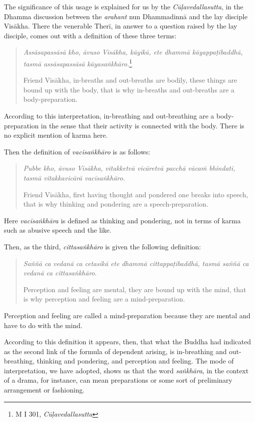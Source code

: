 The significance of this usage is explained for us by the \emph{Cūḷavedallasutta}, in the Dhamma discussion between the \emph{arahant} nun Dhammadinnā and the lay disciple Visākha. There the venerable Therī, in answer to a question raised by the lay disciple, comes out with a definition of these three terms:

\begin{quote}
\emph{Assāsapassāsā kho, āvuso Visākha, kāyikā, ete dhammā kāyappaṭibaddhā, tasmā assāsapassāsā kāyasaṅkhāro.}\footnote{M I 301, \emph{Cūḷavedallasutta}}

Friend Visākha, in-breaths and out-breaths are bodily, these things are bound up with the body, that is why in-breaths and out-breaths are a body-preparation.
\end{quote}

According to this interpretation, in-breathing and out-breathing are a body-preparation in the sense that their activity is connected with the body. There is no explicit mention of karma here.

Then the definition of \emph{vacīsaṅkhāro} is as follows:

\begin{quote}
\emph{Pubbe kho, āvuso Visākha, vitakketvā vicāretvā pacchā vācaṁ bhindati, tasmā vitakkavicārā vacīsaṅkhāro.}

Friend Visākha, first having thought and pondered one breaks into speech, that is why thinking and pondering are a speech-preparation.
\end{quote}

Here \emph{vacīsaṅkhāra} is defined as thinking and pondering, not in terms of karma such as abusive speech and the like.

Then, as the third, \emph{cittasaṅkhāro} is given the following definition:

\begin{quote}
\emph{Saññā ca vedanā ca cetasikā ete dhammā cittappaṭibaddhā, tasmā saññā ca vedanā ca cittasaṅkhāro}.

Perception and feeling are mental, they are bound up with the mind, that is why perception and feeling are a mind-preparation.
\end{quote}

Perception and feeling are called a mind-preparation because they are mental and have to do with the mind.

According to this definition it appears, then, that what the Buddha had indicated as the second link of the formula of dependent arising, is in-breathing and out-breathing, thinking and pondering, and perception and feeling. The mode of interpretation, we have adopted, shows us that the word \emph{saṅkhāra}, in the context of a drama, for instance, can mean preparations or some sort of preliminary arrangement or fashioning.

